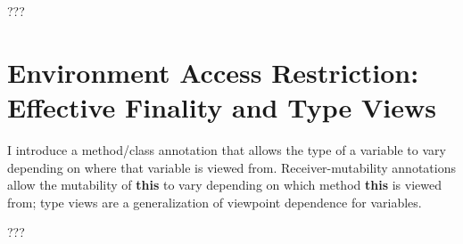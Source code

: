 \documentclass[11pt]{report}
\newcommand{\cdf}{\bf\ttfamily} %
\newcommand{\cd}{\cdf\small}  %
\begin{document}
???


\chapter{Environment Access Restriction: Effective Finality and Type Views} \label{chap:as-final-and-type-views}

I introduce a method/class annotation that allows the type of a variable to vary depending on where that variable is viewed from. Receiver-mutability annotations allow the mutability of {\cd this} to vary depending on which method {\cd this} is viewed from; type views are a generalization of viewpoint dependence for variables.

???




\renewcommand*{\bibname}{References}

\end{document}
